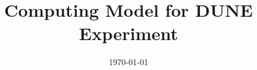 \documentclass[12pt]{article}
\begin{document}

\title{Computing Model for DUNE Experiment}

\date{\today}


\maketitle





\newpage
%

\newpage
\tableofcontents

\newpage


\newpage


\newpage


\newpage


\newpage



\newpage


\newpage


\newpage

\end{document}
